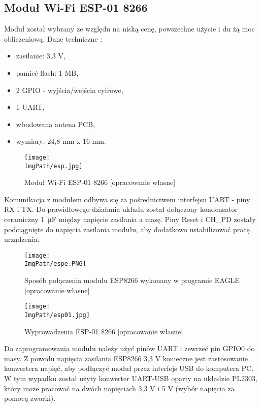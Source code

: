\documentclass[a4paper,12pt,twoside,openany]{report}
\newcommand{\ImgPath}{.}
\begin{document}
\newpage

\subsection{Moduł Wi-Fi ESP-01 8266}

Moduł został wybrany ze względu na niską cenę, powszechne użycie i du żą moc obliczeniową. Dane techniczne \cite{esp}:
\begin{itemize}
\item zasilanie: 3,3 V,
\item pamieć flash: 1 MB,
\item 2 GPIO - wyjścia/wejścia cyfrowe,
\item 1 UART,
\item wbudowana antena PCB,
\item wymiary: 24,8 mm x 16 mm.
\end{itemize}

\begin{figure}[!htbp]
	\begin{center}
\centering
\texttt{[image: \\ImgPath/esp.jpg]}
\end{center}
	\caption{Moduł Wi-Fi ESP-01 8266 [opracowanie własne]}
	\label{schematKomunikacji}
\end{figure}

\newpage
Komunikacja z modułem odbywa się za pośrednictwem interfejsu UART - piny RX i TX. Do prawidłowego działania układu został dołączony kondensator ceramiczny \SI{1}{\micro F} między napięcie zasilania a masę. Piny Reset i CH\_PD zostały podciągnięte do napięcia zasilania modułu, aby dodatkowo ustabilizować pracę urządzenia.

\begin{figure}[!htbp]
	\begin{center}
\centering
\texttt{[image: \\ImgPath/espe.PNG]}
\end{center}
	\caption{Sposób połączenia modułu ESP8266 wykonany w programie EAGLE [opracowanie własne]}
	\label{schematKomunikacji}
\end{figure}

\begin{figure}[!htbp]
	\begin{center}
\centering
\texttt{[image: \\ImgPath/esp01.jpg]}
\end{center}
	\caption{Wyprowadzenia ESP-01 8266 [opracowanie własne]}
	\label{schematKomunikacji}
\end{figure}

Do zaprogramowania modułu należy użyć pinów UART i zewrzeć pin GPIO0 do masy. Z powodu napięcia zasilania ESP8266 3,3 V konieczne jest zastosowanie konwertera napięć, aby podłączyć moduł przez interfejs USB do komputera PC. W tym wypadku został użyty konwerter UART-USB oparty na układzie PL2303, który może pracować na dwóch napięciach 3,3 V i 5 V (wybór napięcia za pomocą zworki).
\end{document}
